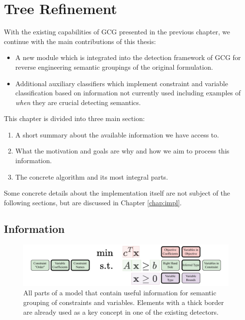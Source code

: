 \chapter{Tree Refinement}
\label{chap:tree}

	With the existing capabilities of \ac{GCG} presented in the previous chapter, we continue with the main contributions of this thesis:
	
	\begin{itemize}
		\item A new module which is integrated into the detection framework of \ac{GCG} for reverse engineering semantic groupings of the original formulation.
		\item Additional auxiliary classifiers which implement constraint and variable classification based on information not currently used including examples of \textit{when} they are crucial detecting semantics.
	\end{itemize}

	This chapter is divided into three main section:
	
	\begin{enumerate}
		\item A short summary about the available information we have access to.
		\item What the motivation and goals are why and how we aim to process this information.
		\item The concrete algorithm and its most integral parts.
	\end{enumerate}
	
	Some concrete details about the implementation itself are not subject of the following sections, but are discussed in Chapter \ref{chap:impl}.

	\section{Information}
	
	\begin{figure}[ht!]
		\centering
		\includegraphics[scale=0.8]{Bilder/DrawIO/model_information}
		\caption{All parts of a model that contain useful information for semantic grouping of constraints and variables. Elements with a thick border are already used as a key concept in one of the existing detectors.}
		\label{fig:tree:information}
	\end{figure}
	
